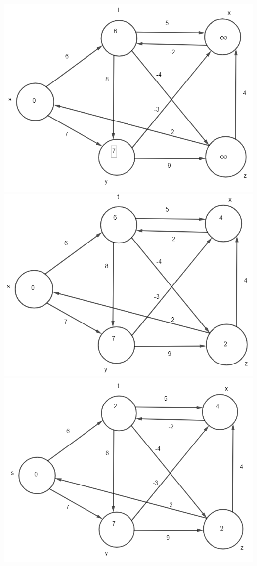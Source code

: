 \documentclass[12pt]{article}
\begin{document}
\begin{enumerate}
\includegraphics[scale=.65]{24.1-1 Vertex S/1-2 First iteration.png}\\
\includegraphics[scale=.65]{24.1-1 Vertex S/1-2 Second iteration.png}\\
\includegraphics[scale=.65]{24.1-1 Vertex S/1-2 third iteration.png}\\

\end{enumerate}
\end{document}

